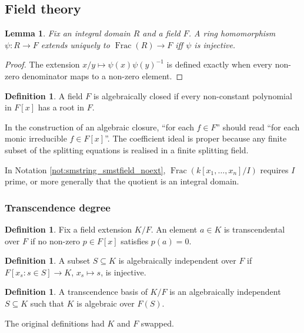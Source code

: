 \documentclass[12pt]{article}
\theoremstyle{plain}
\newtheorem{lemma}[thm]{Lemma}
\theoremstyle{definition}
\newtheorem{defn}[thm]{Definition} %
\begin{document}
\subsection{Field theory}

\begin{lemma}\label{lem:frac_corr}
Fix an integral domain $R$ and a field $F$. A ring homomorphism $\psi:R\to F$ extends uniquely to $\operatorname{Frac}(R)\to F$ iff $\psi$ is injective.
\end{lemma}
\begin{proof}
The extension $x/y\mapsto\psi(x)\psi(y)^{-1}$ is defined exactly when every non-zero denominator maps to a non-zero element.
\end{proof}

\begin{defn}
A field $F$ is algebraically closed if every non-constant polynomial in $F[x]$ has a root in $F$.
\end{defn}

In the construction of an algebraic closure, ``for each $f\in F$'' should read ``for each monic irreducible $f\in F[x]$''. The coefficient ideal is proper because any finite subset of the splitting equations is realised in a finite splitting field.

In Notation \ref{not:smstring_smstfield_noext}, $\operatorname{Frac}(k[x_1,\ldots,x_n]/I)$ requires $I$ prime, or more generally that the quotient is an integral domain.

\subsubsection*{Transcendence degree}

\begin{defn}
Fix a field extension $K/F$. An element $a\in K$ is transcendental over $F$ if no non-zero $p\in F[x]$ satisfies $p(a)=0$.
\end{defn}

\begin{defn}
A subset $S\subseteq K$ is algebraically independent over $F$ if $F[x_s:s\in S]\to K$, $x_s\mapsto s$, is injective.
\end{defn}

\begin{defn}
A transcendence basis of $K/F$ is an algebraically independent $S\subseteq K$ such that $K$ is algebraic over $F(S)$.
\end{defn}

The original definitions had $K$ and $F$ swapped.
\end{document}
